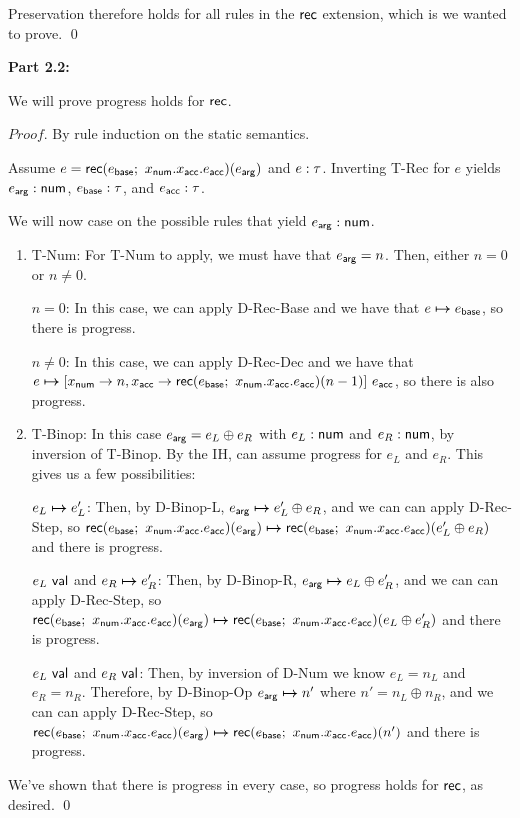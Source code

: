 \documentclass[11pt]{article}
\begin{document}
Preservation therefore holds for all rules in the $\mathsf{rec}$ extension, 
which is we wanted to prove. \qed

\textbf{Part 2.2:}

We will prove progress holds for $\mathsf{rec}$.

$Proof.$ By rule induction on the static semantics.

Assume $e = \mathsf{rec}(e_{\mathsf{base}}; ~ x_{\mathsf{num}}.x_{\mathsf{acc}}.e_{\mathsf{acc}})(e_{\mathsf{arg}})$
and $e : \tau$. Inverting T-Rec for $e$ yields 
$e_{\mathsf{arg}} : \mathsf{num}$, $e_{\mathsf{base}} : \tau$, and 
$e_{\mathsf{acc}} : \tau$.

We will now case on the possible rules that yield $e_{\mathsf{arg}} : \mathsf{num}$.

\begin{enumerate}
    \item T-Num: For T-Num to apply, we must have that $e_{\mathsf{arg}} = n$. Then, either
    $n = 0$ or $n \neq 0$.
    
    $n = 0$: In this case, we can apply D-Rec-Base and we have that
    $e \boldsymbol{\mapsto} e_{\mathsf{base}}$, so there is progress.
    
    $n \neq 0$: In this case, we can apply D-Rec-Dec 
    and we have that $\steps{e}{[x_\msf{num} \rightarrow n, x_\msf{acc} \rightarrow \rec{e_\msf{base}}{x_\msf{num}}{x_\msf{acc}}{e_\msf{acc}}{n-1}] \ e_\msf{acc}}$,
    so there is also progress.
    
    \item T-Binop: In this case $e_{\mathsf{arg}} = e_L \oplus e_R$ with 
    $e_L : \mathsf{num}$ and $e_R : \mathsf{num}$, by inversion of T-Binop.
    By the IH, can assume progress for $e_L$ and $e_R$. This gives us a few possibilities:
    
    $e_L \boldsymbol{\mapsto} e_L'$: Then, by D-Binop-L, $e_{\mathsf{arg}} \boldsymbol{\mapsto} e_L' \oplus e_R$, and we can can apply D-Rec-Step, so ${\mathsf{rec}(e_{\mathsf{base}}; ~ x_{\mathsf{num}}.x_{\mathsf{acc}}.e_{\mathsf{acc}})(e_{\mathsf{arg}}) \boldsymbol{\mapsto} \mathsf{rec}(e_{\mathsf{base}}; ~ x_{\mathsf{num}}.x_{\mathsf{acc}}.e_{\mathsf{acc}})(e_L' \oplus e_R)}$ and there is progress.
    
    $e_L~\mathsf{val}$ and $e_R \boldsymbol{\mapsto} e_R'$: Then, by D-Binop-R, $e_{\mathsf{arg}} \boldsymbol{\mapsto} e_L \oplus e_R'$, and we can can apply D-Rec-Step, so ${\mathsf{rec}(e_{\mathsf{base}}; ~ x_{\mathsf{num}}.x_{\mathsf{acc}}.e_{\mathsf{acc}})(e_{\mathsf{arg}}) \boldsymbol{\mapsto} \mathsf{rec}(e_{\mathsf{base}}; ~ x_{\mathsf{num}}.x_{\mathsf{acc}}.e_{\mathsf{acc}})(e_L \oplus e_R')}$ and there is progress.
    
    $e_L~\mathsf{val}$ and $e_R~\mathsf{val}$: Then, by inversion of D-Num we know $e_L = n_L$ and
    $e_R = n_R$. Therefore, by D-Binop-Op $e_{\mathsf{arg}} \boldsymbol{\mapsto} n'$ where 
    $n' = n_L \oplus n_R$, and we can can apply D-Rec-Step, so ${\mathsf{rec}(e_{\mathsf{base}}; ~ x_{\mathsf{num}}.x_{\mathsf{acc}}.e_{\mathsf{acc}})(e_{\mathsf{arg}}) \boldsymbol{\mapsto} \mathsf{rec}(e_{\mathsf{base}}; ~ x_{\mathsf{num}}.x_{\mathsf{acc}}.e_{\mathsf{acc}})(n')}$ and there is progress.

\end{enumerate}{}

We've shown that there is progress in every case, so progress holds for $\mathsf{rec}$, 
as desired. \qed
\end{document}
